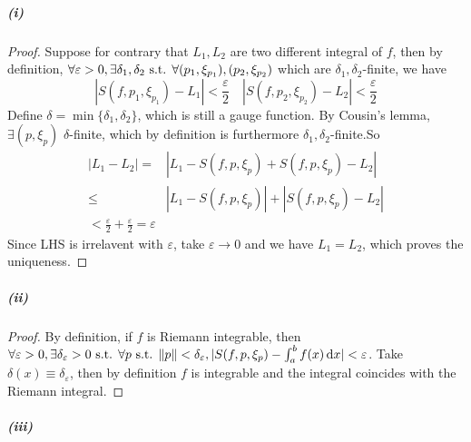 \documentclass{article}
\begin{document}
\subparagraph{(i)}
\begin{proof}
Suppose for contrary that $L_1,L_2$ are two different \HK integral of $f$, then by definition, $\forall \varepsilon>0, \exists \delta_1,\delta_2\text{ s.t. } \forall (p_1,\xi_{p_1}), (p_2,\xi_{p_2})$ which are $\delta_1,\delta_2$-finite, we have 
\[|S(f,p_1,\xi_{p_1})-L_1|<\frac{\varepsilon}{2}\quad |S(f,p_2,\xi_{p_2})-L_2|<\frac{\varepsilon}{2}\]
Define $\delta=\min\{\delta_1,\delta_2\}$, which is still a gauge function. By Cousin's lemma, $\exists (p,\xi_p)$ $\delta$-finite, which by definition is furthermore $\delta_1,\delta_2$-finite.So
\[\begin{aligned}
|L_1-L_2|=&|L_1-S(f,p,\xi_p)+S(f,p,\xi_p)-L_2|\\
\leq&|L_1-S(f,p,\xi_p)|+|S(f,p,\xi_p)-L_2|\\
<\frac{\varepsilon}{2}+\frac{\varepsilon}{2}=\varepsilon
\end{aligned}\]
Since LHS is irrelavent with $\varepsilon$, take $\varepsilon\to 0$ and we have $L_1=L_2$, which proves the uniqueness.
\end{proof}
\subparagraph{(ii)}
\begin{proof}
By definition, if $f$ is Riemann integrable, then $\forall\varepsilon>0,\exists \delta_\varepsilon>0\text{ s.t. }\forall p\text{ s.t. } \|p\|<\delta_\varepsilon, |S(f,p,\xi_p)-\int_a^bf(x)\,\mathrm{d} x|<\varepsilon$. Take $\delta(x)\equiv \delta_\varepsilon$, then by definition $f$ is \HK integrable and the integral coincides with the Riemann integral.
\end{proof}
\subparagraph{(iii)}
\end{document}
